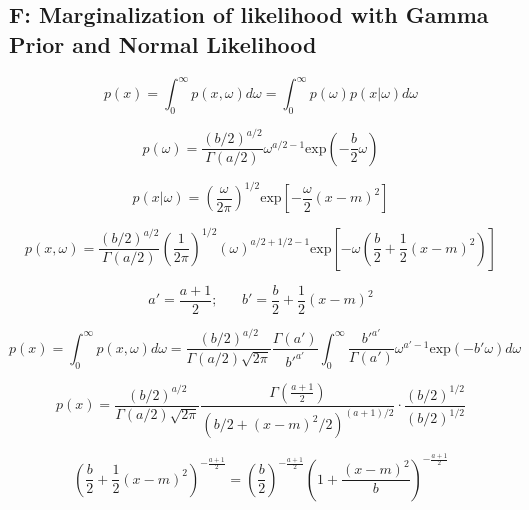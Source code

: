 \documentclass[12pt]{article}
\begin{document}
    \subsection*{F: Marginalization of likelihood with Gamma Prior and Normal Likelihood}

        \begin{equation}
              p(x) = \int_0^{\infty} p(x,\omega)d\omega = \int_0^{\infty} p(\omega)p(x|\omega)d\omega
        \end{equation}

        \begin{equation}
              p(\omega) = \frac{(b/2)^{a/2}}{\Gamma(a/2)}{\omega}^{a/2-1} \text{exp}\left (-\frac{b}{2}\omega \right)
        \end{equation}

        \begin{equation}
              p(x|\omega) = \left( \frac{\omega}{2 \pi}\right)^{1/2} \text{exp} \left [ -\frac{\omega}{2}(x - m)^2\right]
        \end{equation}

        \begin{equation}
              p(x,\omega) = \frac{(b/2)^{a/2}}{\Gamma(a/2)}  \left( \frac{1}{2 \pi}\right)^{1/2} (\omega)^{a/2+1/2-1}\text{exp}\left[-\omega \left( \frac{b}{2} + \frac{1}{2}(x - m)^2\right) \right]
        \end{equation}

        \begin{equation}
              a' = \frac{a+1}{2}; \hspace{20pt} b'= \frac{b}{2} + \frac{1}{2}(x-m)^2
        \end{equation}

        \begin{equation}
              p(x) = \int_0^{\infty}p(x, \omega) d\omega = \frac{(b/2)^{a/2}}{\Gamma(a/2) \sqrt{2\pi}} \frac{\Gamma(a')}{b'^{a'}} \int_0^{\infty} \frac{b'^{a'}}{\Gamma(a')}\omega^{a'-1} \text{exp}(-b' \omega) d\omega
        \end{equation}

        \begin{equation}
              p(x) = \frac{(b/2)^{a/2}}{\Gamma(a/2) \sqrt{2\pi}} \frac{\Gamma(\frac{a+1}{2})}{(b/2 + (x-m)^2/2)^{(a+1)/2}} \cdot \frac{(b/2)^{1/2}}{(b/2)^{1/2}}
        \end{equation}

        \begin{equation}
              \left( \frac{b}{2} + \frac{1}{2} (x-m)^2\right)^{-\frac{a+1}{2}} = \left (\frac{b}{2} \right)^{-\frac{a+1}{2}} \left( 1 + \frac{(x-m)^2}{b} \right)^{-\frac{a+1}{2}}
        \end{equation}
\end{document}
